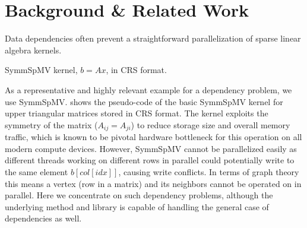 \section{Background \& Related Work} \label{sec:background}
Data dependencies often prevent a straightforward parallelization of sparse linear algebra kernels.
\begin{algorithm}[b]
	\caption{\label{alg:symmSpMV} \acrshort{SymmSpMV} kernel,  $b=Ax$, in \acrshort{CRS} format.}%
	\begin{algorithmic}[1]
		\Statex{\textcolor{darkgray} {//Loop over all matrix rows}}
			\Statex{\hspace{1.5em} \textcolor{darkgray} {//Loop over all non-zero entries in a row}}
			\EndFor
		\EndFor
	\end{algorithmic}
\end{algorithm}
As a representative and highly relevant example for a \DTWO dependency problem, we use \acrfull{SymmSpMV}. 
 shows the pseudo-code of the basic \acrshort{SymmSpMV} kernel 
for upper triangular matrices stored in \acrfull{CRS} \cite{CRS} format. The kernel exploits the symmetry
of the matrix ($A_{ij} = A_{ji}$)  to reduce storage size and overall memory traffic, 
 which is known to be pivotal hardware bottleneck for this operation on all modern compute devices.  
However, \acrshort{SymmSpMV} cannot be parallelized easily as 
different threads working on different rows in parallel could potentially 
write to the same element $b[col[idx]]$,
causing write conflicts.
In terms of graph theory this means a vertex (row in a matrix) and 
its \DTWO neighbors \cite{dist_k_def} cannot be operated on in parallel.
Here we concentrate on such \DTWO dependency problems, although 
the underlying method and library is capable of handling 
the general case of \DK dependencies as well.


